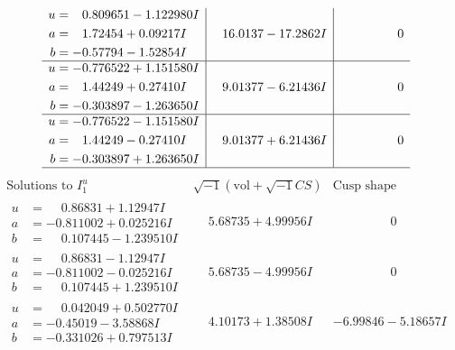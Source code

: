 \documentclass[1p]{elsarticle_modified}
\theoremstyle{definition}
\newcommand{\I}{\sqrt{-1}}
\begin{document}
$$\begin{array}{c|c|c}
\begin{aligned}
u &= \phantom{-}0.809651 - 1.122980 I \\
a &= \phantom{-}1.72454 + 0.09217 I \\
b &= -0.57794 - 1.52854 I\end{aligned}
 & \phantom{-}16.0137 - 17.2862 I & \phantom{-0.000000 } 0 \\ \hline\begin{aligned}
u &= -0.776522 + 1.151580 I \\
a &= \phantom{-}1.44249 + 0.27410 I \\
b &= -0.303897 - 1.263650 I\end{aligned}
 & \phantom{-}9.01377 - 6.21436 I & \phantom{-0.000000 } 0 \\ \hline\begin{aligned}
u &= -0.776522 - 1.151580 I \\
a &= \phantom{-}1.44249 - 0.27410 I \\
b &= -0.303897 + 1.263650 I\end{aligned}
 & \phantom{-}9.01377 + 6.21436 I & \phantom{-0.000000 } 0\\
 \hline 
 \end{array}$$\newpage$$\begin{array}{c|c|c}  
\text{Solutions to }I^u_{1}& \I (\text{vol} + \sqrt{-1}CS) & \text{Cusp shape}\\
 \hline 
\begin{aligned}
u &= \phantom{-}0.86831 + 1.12947 I \\
a &= -0.811002 + 0.025216 I \\
b &= \phantom{-}0.107445 - 1.239510 I\end{aligned}
 & \phantom{-}5.68735 + 4.99956 I & \phantom{-0.000000 } 0 \\ \hline\begin{aligned}
u &= \phantom{-}0.86831 - 1.12947 I \\
a &= -0.811002 - 0.025216 I \\
b &= \phantom{-}0.107445 + 1.239510 I\end{aligned}
 & \phantom{-}5.68735 - 4.99956 I & \phantom{-0.000000 } 0 \\ \hline\begin{aligned}
u &= \phantom{-}0.042049 + 0.502770 I \\
a &= -0.45019 - 3.58868 I \\
b &= -0.331026 + 0.797513 I\end{aligned}
 & \phantom{-}4.10173 + 1.38508 I & -6.99846 - 5.18657 I \\ \hline\begin{aligned}

\end{aligned}
\end{array}$$
\end{document}
